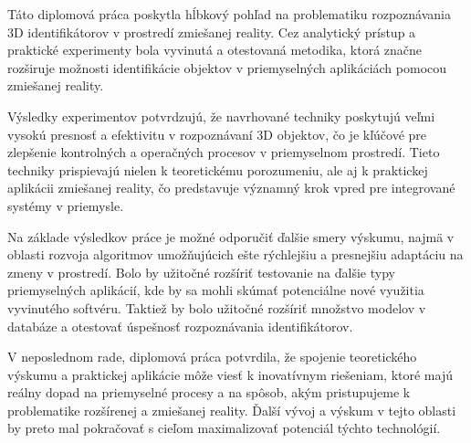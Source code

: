 Táto diplomová práca poskytla hĺbkový pohľad na problematiku rozpoznávania 3D identifikátorov v prostredí zmiešanej reality. Cez analytický prístup a praktické experimenty bola vyvinutá a otestovaná metodika, ktorá značne rozširuje možnosti identifikácie objektov v priemyselných aplikáciách pomocou zmiešanej reality.

Výsledky experimentov potvrdzujú, že navrhované techniky poskytujú veľmi vysokú presnosť a efektivitu v rozpoznávaní 3D objektov, čo je kľúčové pre zlepšenie kontrolných a operačných procesov v priemyselnom prostredí. Tieto techniky prispievajú nielen k teoretickému porozumeniu, ale aj k praktickej aplikácii zmiešanej reality, čo predstavuje významný krok vpred pre integrované systémy v priemysle.

Na základe výsledkov práce je možné odporučiť ďalšie smery výskumu, najmä v oblasti rozvoja algoritmov umožňujúcich ešte rýchlejšiu a presnejšiu adaptáciu na zmeny v prostredí. Bolo by užitočné rozšíriť testovanie na ďalšie typy priemyselných aplikácií, kde by sa mohli skúmať potenciálne nové využitia vyvinutého softvéru. Taktiež by bolo užitočné rozšíriť množstvo modelov v databáze a otestovať úspešnosť rozpoznávania identifikátorov.

V neposlednom rade, diplomová práca potvrdila, že spojenie teoretického výskumu a praktickej aplikácie môže viesť k inovatívnym riešeniam, ktoré majú reálny dopad na priemyselné procesy a na spôsob, akým pristupujeme k problematike rozšírenej a zmiešanej reality. Ďalší vývoj a výskum v tejto oblasti by preto mal pokračovať s cieľom maximalizovať potenciál týchto technológií.
